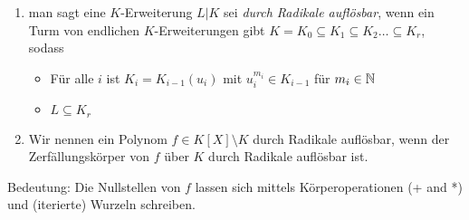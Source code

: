 \documentclass[../main.tex]{subfiles}
\begin{document}
\begin{definition}$ $
    \begin{enumerate}[label=(\roman*)]
        \item man sagt eine $K$-Erweiterung $L|K$ sei \emph{durch Radikale auflösbar}, wenn ein Turm von endlichen $K$-Erweiterungen gibt $K=K_0\subseteq K_1\subseteq K_2\dots\subseteq K_r$, sodass
        \begin{itemize}
            \item Für alle $i$ ist $K_i=K_{i-1}(u_i)$ mit $u_i^{m_i}\in K_{i-1}$ für $m_i\in\mathbb{N}$
            \item $L\subseteq K_r$
        \end{itemize}
        \item Wir nennen ein Polynom $f\in K[X]\setminus K$ durch Radikale auflösbar, wenn der Zerfällungskörper von $f$ über $K$ durch Radikale auflösbar ist.
    \end{enumerate}
\end{definition}
Bedeutung:
Die Nullstellen von $f$ lassen sich mittels Körperoperationen (+ and *) und (iterierte) Wurzeln schreiben.
\end{document}
